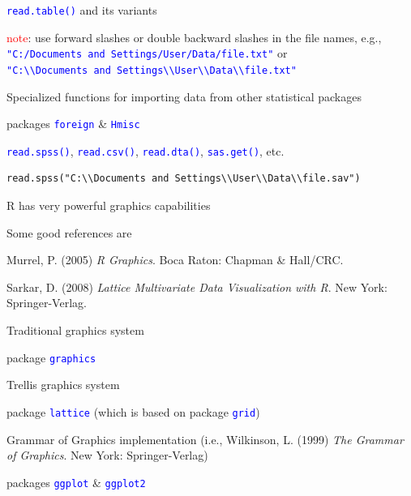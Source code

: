 \documentclass{presentatiesmetlogo}
\newcommand{\code}[1]{\textcolor{blue}{\texttt{#1}}}
\newcommand{\R}{{\textsf{R} }}
\let \nl = \newline
\begin{document}
\bitem
\item \code{read.table()} and its variants
\bitemt
\item \textcolor{red}{note}: use forward slashes or double backward slashes in the file names, e.g.,\\
\code{"C:/Documents and Settings/User/Data/file.txt"} or\\
\code{"C:\textbackslash\textbackslash Documents and Settings\textbackslash\textbackslash User\textbackslash\textbackslash Data\textbackslash\textbackslash file.txt"}
\nl
\eitemt
\item Specialized functions for importing data from other statistical packages
\bitemt
\item packages \code{foreign} \& \code{Hmisc}
\item \code{read.spss()}, \code{read.csv()}, \code{read.dta()}, \code{sas.get()}, etc.
\nl
\eitemt
\eitem
\begin{verbatim}
read.spss("C:\\Documents and Settings\\User\\Data\\file.sav")
\end{verbatim}
\bitem
\item \R has very powerful graphics capabilities
\nl
\item Some good references are
\bitemt
\item Murrel, P. (2005) \emph{R Graphics}. Boca Raton: Chapman \& Hall/CRC.
\item Sarkar, D. (2008) \emph{Lattice Multivariate Data Visualization with R}. New York: Springer-Verlag.
\nl
\eitemt
\eitem
\bitem
\item Traditional graphics system
\bitemt
\item package \code{graphics}
\nl
\eitemt
\item Trellis graphics system
\bitemt
\item package \code{lattice} (which is based on package \code{grid})
\nl
\eitemt
\item Grammar of Graphics implementation (i.e., Wilkinson, L. (1999) \emph{The Grammar of Graphics}. New York: Springer-Verlag)
\bitemt
\item packages \code{ggplot} \& \code{ggplot2}
\eitemt
\end{document}
